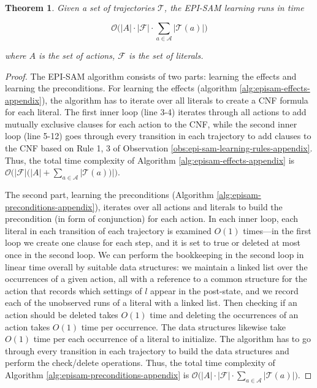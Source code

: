 \documentclass[letterpaper]{article} %
\newtheorem{theorem}{Theorem}
\begin{document}
\begin{theorem}
Given a set of trajectories $\mathcal{T}$, the EPI-SAM learning runs in time 
\begin{small}
\[\mathcal{O}\Big( |A|\cdot|\mathcal{F}|\cdot \sum_{a\in \mathcal{A}}|\mathcal{T}(a)|    \Big)\]
\end{small}
where $A$ is the set of actions, $\mathcal{F}$ is the set of literals.
\end{theorem}
\begin{proof}
The EPI-SAM algorithm consists of two parts: learning the effects and learning the preconditions. For learning the effects (algorithm \ref{alg:episam-effects-appendix}), the algorithm has to iterate over all literals to create a CNF formula for each literal. The first inner loop (line 3-4) iterates through all actions to add mutually exclusive clauses for each action to the CNF, while the second inner loop (line 5-12) goes through every transition in each trajectory to add clauses to the CNF based on Rule 1, 3 of Observation \ref{obs:epi-sam-learning-rules-appendix}. Thus, the total time complexity of Algorithm \ref{alg:episam-effects-appendix} is $\mathcal{O}\Big(|\mathcal{F}|(|A| + \sum_{a\in \mathcal{A}}|\mathcal{T}(a))|\Big)$.  

The second part, learning the preconditions (Algorithm \ref{alg:episam-preconditions-appendix}), iterates over all actions and literals to build the precondition (in form of conjunction) for each action. In each inner loop, each literal in each transition of each trajectory is examined $O(1)$ times---in the first loop we create one clause for each step, and it is set to true or deleted at most once in the second loop. 
We can perform the bookkeeping in the second loop in linear time overall by suitable data structures: we maintain a linked list over the occurrences of a given action, all with a reference to a common structure for the action that records which settings of $l$ appear in the post-state, and we record each of the unobserved runs of a literal with a linked list. Then checking if an action should be deleted takes $O(1)$ time and deleting the occurrences of an action takes $O(1)$ time per occurrence. The data structures likewise take $O(1)$ time per each occurrence of a literal to initialize. The algorithm has to go through every transition in each trajectory to build the data structures and perform the check/delete operations. Thus, the total time complexity of Algorithm \ref{alg:episam-preconditions-appendix} is $\mathcal{O}\Big(|A|\cdot|\mathcal{F}|\cdot \sum_{a\in \mathcal{A}}|\mathcal{T}(a)|\Big)$.  \end{proof}
\end{document}
